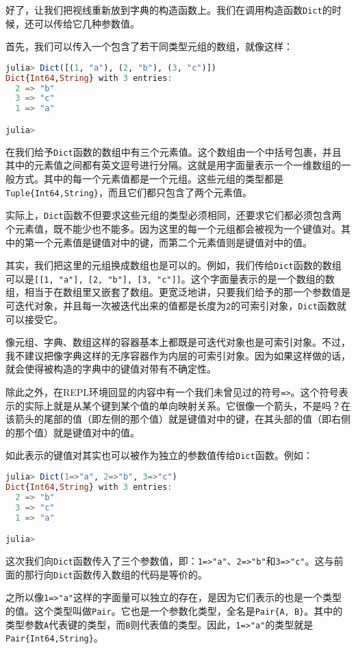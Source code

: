 好了，让我们把视线重新放到字典的构造函数上。我们在调用构造函数\verb|Dict|的时候，还可以传给它几种参数值。

首先，我们可以传入一个包含了若干同类型元组的数组，就像这样：
\begin{lstlisting}[language=julia]
julia> Dict([(1, "a"), (2, "b"), (3, "c")])
Dict{Int64,String} with 3 entries:
  2 => "b"
  3 => "c"
  1 => "a"

julia> 
\end{lstlisting}

在我们给予\verb|Dict|函数的数组中有三个元素值。这个数组由一个中括号包裹，并且其中的元素值之间都有英文逗号进行分隔。这就是用字面量表示一个一维数组的一般方式。其中的每一个元素值都是一个元组。这些元组的类型都是\verb|Tuple{Int64,String}|，而且它们都只包含了两个元素值。

实际上，\verb|Dict|函数不但要求这些元组的类型必须相同，还要求它们都必须包含两个元素值，既不能少也不能多。因为这里的每一个元组都会被视为一个键值对。其中的第一个元素值是键值对中的键，而第二个元素值则是键值对中的值。

其实，我们把这里的元组换成数组也是可以的。例如，我们传给\verb|Dict|函数的数组可以是\verb|[[1, "a"], [2, "b"], [3, "c"]]|。这个字面量表示的是一个数组的数组，相当于在数组里又嵌套了数组。更宽泛地讲，只要我们给予的那一个参数值是可迭代对象，并且每一次被迭代出来的值都是长度为\verb|2|的可索引对象，\verb|Dict|函数就可以接受它。

像元组、字典、数组这样的容器基本上都既是可迭代对象也是可索引对象。不过，我不建议把像字典这样的无序容器作为内层的可索引对象。因为如果这样做的话，就会使得被构造的字典中的键值对带有不确定性。

除此之外，在REPL环境回显的内容中有一个我们未曾见过的符号\verb|=>|。这个符号表示的实际上就是从某个键到某个值的单向映射关系。它很像一个箭头，不是吗？在该箭头的尾部的值（即左侧的那个值）就是键值对中的键，在其头部的值（即右侧的那个值）就是键值对中的值。

如此表示的键值对其实也可以被作为独立的参数值传给\verb|Dict|函数。例如：
\begin{lstlisting}[language=julia]
julia> Dict(1=>"a", 2=>"b", 3=>"c")
Dict{Int64,String} with 3 entries:
  2 => "b"
  3 => "c"
  1 => "a"

julia> 
\end{lstlisting}

这次我们向\verb|Dict|函数传入了三个参数值，即：\verb|1=>"a"|、\verb|2=>"b"|和\verb|3=>"c"|。这与前面的那行向\verb|Dict|函数传入数组的代码是等价的。

之所以像\verb|1=>"a"|这样的字面量可以独立的存在，是因为它们表示的也是一个类型的值。这个类型叫做\verb|Pair|。它也是一个参数化类型，全名是\verb|Pair{A, B}|。其中的类型参数\verb|A|代表键的类型，而\verb|B|则代表值的类型。因此，\verb|1=>"a"|的类型就是\verb|Pair{Int64,String}|。

